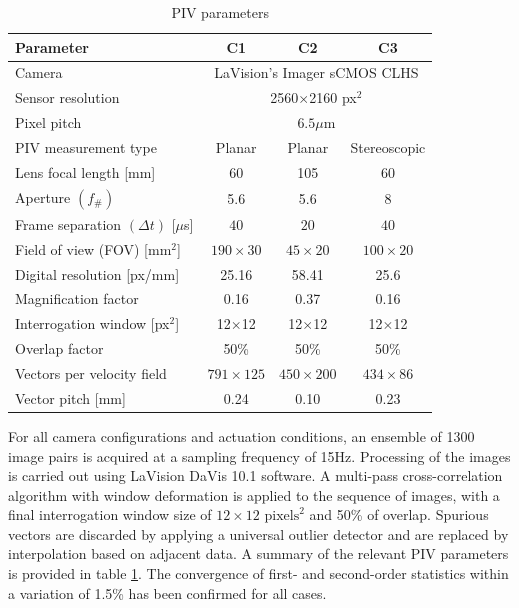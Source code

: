 \begin{table}
\centering
\begin{tabular}{lccc}
\toprule
\multicolumn{1}{l}{Parameter} & C1 & C2 & C3 \\ \midrule
Camera & \multicolumn{3}{c}{LaVision’s Imager sCMOS CLHS} \\
Sensor resolution & \multicolumn{3}{c}{2560$\times$2160 px$^2$} \\
Pixel pitch & \multicolumn{3}{c}{$6.5\mu$m} \\
PIV measurement type & Planar & Planar & Stereoscopic\\
Lens focal length [mm] & 60 & 105 & 60\\
Aperture $(f_{\#})$ & 5.6 & 5.6 & 8\\
Frame separation $(\Delta t)$ [$\mu$s] & $40$ & $20$ & $40$\\
Field of view (FOV) [mm$^2$] & $190 \times 30$ & $45 \times 20$ & $100 \times 20$\\
Digital resolution [px/mm] & 25.16 & 58.41 & 25.6 \\
Magnification factor & 0.16 & 0.37 & 0.16\\
Interrogation window [px$^2$] & 12$\times$12 & 12$\times$12 & 12$\times$12 \\
Overlap factor & 50\% & 50\% & 50\%\\
Vectors per velocity field & $791\times125$ & $450 \times 200$ & $434 \times 86$\\
Vector pitch [mm] & 0.24 & 0.10 & 0.23\\
\bottomrule
\end{tabular}
\caption{PIV parameters} \label{tab:PIVparam}
\end{table}

For all camera configurations and actuation conditions, an ensemble of 1300 image pairs is acquired at a sampling frequency of 15Hz. Processing of the images is carried out using LaVision DaVis 10.1 software. A multi-pass %
cross-correlation algorithm \citep{Willert1991digitalpiv} with window deformation \citep{scarano2001iterativeimgdef} is applied to the sequence of images, with a final interrogation window size of $12\times12$ $\mathrm{pixels}^2$ and 50\% of overlap. Spurious vectors are discarded by applying a universal outlier detector \citep{westerweel2005outlier} and are replaced by interpolation based on adjacent data. A summary of the relevant PIV parameters is provided in table \ref{tab:PIVparam}. The convergence of first- and second-order statistics within a variation of 1.5\% has been confirmed for all cases.

